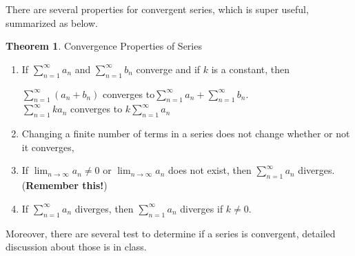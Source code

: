 \documentclass[12pt]{article}
\theoremstyle{definition}
\newtheorem{thm}{Theorem}[section]
\theoremstyle{definition}
\theoremstyle{remark}
\theoremstyle{definition}
\theoremstyle{definition}
\theoremstyle{definition}
\begin{document}
There are several properties for convergent series, which is super useful, summarized as below.
\begin{thm}
Convergence Properties of Series
\begin{enumerate}
\item If $\sum_{n=1}^{\infty} a_n$ and $\sum_{n=1}^{\infty} b_n$ converge and if $k$ is a constant, then

$\sum_{n=1}^{\infty} (a_n+b_n)$ converges to$\sum_{n=1}^{\infty} a_n + \sum_{n=1}^{\infty} b_n$.\\
$\sum_{n=1}^{\infty} ka_n$ converges to $k\sum_{n=1}^{\infty} a_n$

\item Changing a finite number of terms in a series does not change whether or not it converges,
\item  If $\lim_{n \to \infty}a_n\neq 0$ or $\lim_{n \to \infty}a_n$ does not exist, then
$\sum_{n=1}^{\infty} a_n$ diverges. (\textbf{Remember this!})
\item If $\sum_{n=1}^{\infty} a_n$ diverges, then $\sum_{n=1}^{\infty} a_n$ diverges if $k\neq 0$.
\end{enumerate}
\end{thm}
\pagebreak
Moreover, there are several test to determine if a series is convergent, detailed discussion about those is in class.
\end{document}
